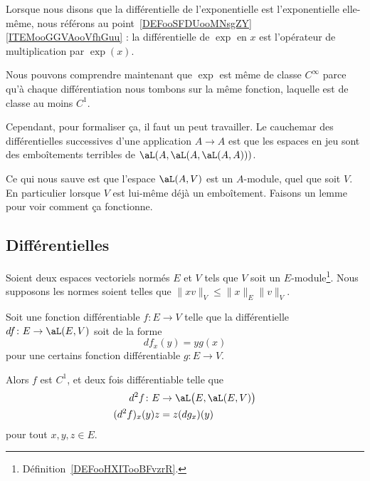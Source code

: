 \begin{normaltext}
    Lorsque nous disons que la différentielle de l'exponentielle est l'exponentielle elle-même, nous référons au point~\ref{DEFooSFDUooMNsgZY}\ref{ITEMooGGVAooVfhGuu} : la différentielle de \( \exp\) en \( x\) est l'opérateur de multiplication par \( \exp(x)\).

    Nous pouvons comprendre maintenant que \( \exp\) est même de classe \(  C^{\infty}\) parce qu'à chaque différentiation nous tombons sur la même fonction, laquelle est de classe au moins \( C^1\).

    Cependant, pour formaliser ça, il faut un peut travailler. Le cauchemar des différentielles successives d'une application \( A\to A\) est que les espaces en jeu sont des emboîtements terribles de \( \aL(A,\aL(A,\aL(A,A)))\).

    Ce qui nous sauve est que l'espace \( \aL(A,V)\) est un \( A\)-module, quel que soit \( V\). En particulier lorsque \( V\) est lui-même déjà un emboîtement. Faisons un lemme pour voir comment ça fonctionne.
\end{normaltext}

\subsection{Différentielles}

\begin{lemma}
    Soient deux espaces vectoriels normés \( E\) et \( V\) tels que \( V\) soit un \( E\)-module\footnote{Définition~\ref{DEFooHXITooBFvzrR}.}. Nous supposons les normes soient telles que \( \| xv \|_{V}\leq \| x \|_E\| v \|_V\).

    Soit une fonction différentiable \( f\colon E\to V\) telle que la différentielle \( df\colon E\to \aL(E,V)\) soit de la forme
    \begin{equation}
        df_x(y)=yg(x)
    \end{equation}
    pour une certains fonction différentiable \( g\colon E\to V\).

    Alors \( f\) est \( C^1\), et deux fois différentiable telle que
    \begin{equation}
        \begin{aligned}
            d^2f\colon E&\to \aL\big( E,\aL(E,V) \big) \\
            (d^2f)_x(y)z&=z(dg_x)(y)
        \end{aligned}
    \end{equation}
    pour tout \( x,y,z\in E\).
\end{lemma}

